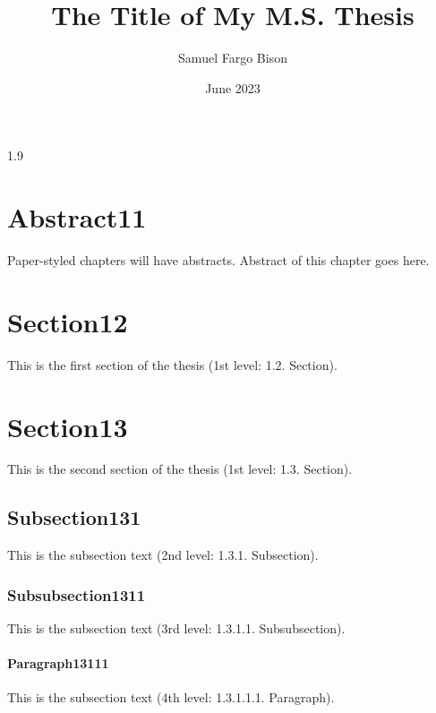 \documentclass[ms-thesis,12pt,mathdesign]{ndsu-thesis-2022}
\title{The Title of My M.S. Thesis}
\author{Samuel Fargo Bison}
\date{June 2023}
\newcommand\myspacing{1.9} %
\begin{document}
\begin{spacing}{\myspacing}      %


\section{Abstract11}
Paper-styled chapters will have abstracts. Abstract of this chapter goes here. \kant[1]

\section{Section12}
This is the first section of the thesis (1st level: 1.2. Section). \kant[2]

\section{Section13}
This is the second section of the thesis (1st level: 1.3. Section). \kant[3]

\subsection{Subsection131}
This is the subsection text (2nd level: 1.3.1. Subsection). \kant[4]

\subsubsection{Subsubsection1311}
This is the subsection text (3rd level: 1.3.1.1. Subsubsection). \kant[5]

\paragraph{Paragraph13111}
This is the subsection text (4th level: 1.3.1.1.1. Paragraph). \kant[6]


\end{spacing}
\end{document}
